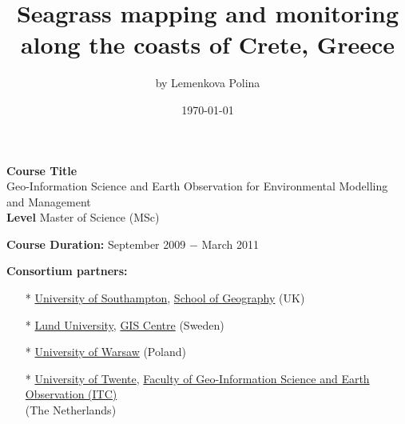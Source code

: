 \documentclass[11pt]{article}
\begin{document}



{}
\begin{titlepage}
	\centering
	\title{Seagrass mapping and monitoring \\ along the coasts of Crete, Greece}
	\author[1]{by Lemenkova Polina}
	\date{\today}
	\maketitle	
\end{titlepage}
\pagebreak

\section*{}
\textbf{Course Title} \\
{Geo-Information Science and Earth Observation for Environmental Modelling and Management}\\

\textbf{Level} \hfill{Master of Science (MSc)}\\

\vspace{1em}

\textbf{Course Duration:} \hfill{September 2009 $-$ March 2011}\\

\vspace{1em}

\textbf{Consortium partners:} \\

\begin{itemize}
	\item[*] \href{http://www.southampton.ac.uk/}{University of Southampton}, \href{http://www.southampton.ac.uk/geography/}{School of Geography} (UK)\\
	\item[*] \href{http://www.lunduniversity.lu.se/}{Lund University}, \href{http://www.giscentrum.lu.se/english/index.htm}{GIS Centre} (Sweden)\\
	\item[*] \href{http://www.uw.edu.pl/en/}{University of Warsaw} (Poland)\\
	\item[*] \href{http://www.utwente.nl/en}{University of Twente}, \href{http://www.itc.nl/}{Faculty of Geo-Information Science and Earth Observation (ITC)} \\ (The Netherlands)
\end{itemize}
\end{document}
